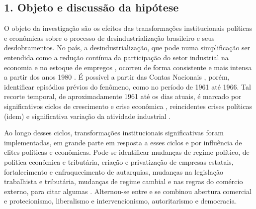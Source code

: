 \subsection{1. Objeto e discussão da hipótese}\label{objeto-e-discussuxe3o-da-hipuxf3tese}

O objeto da investigação são os efeitos das transformações
institucionais políticas e econômicas sobre o processo de
desindustrialização brasileiro e seus desdobramentos. No país, a
desindustrialização, que pode numa simplificação ser entendida como a
redução contínua da participação do setor industrial na economia e no
estoque de empregos
\citep{tregenna_characterising_2009},
ocorreu de forma consistente e mais intensa a partir dos anos 1980
\citep{oreiro_desindustrializacao_2010}. É possível a partir das Contas Nacionais
\citep{ibge_sd},
porém, identificar episódios prévios do fenômeno, como no período de
1961 até 1966. Tal recorte temporal, de aproximadamente 1961 até os dias
atuais, é marcado por significativos ciclos de crescimento e crise
econômica \citep{souza_historia_2022,viannavillela2015}, reincidentes crises
políticas (idem) e significativa variação da atividade industrial
\citep{morceiro2021}.

Ao longo desses ciclos, transformações institucionais significativas
foram implementadas, em grande parte em resposta a esses ciclos e por
influência de elites políticas e econômicas. Pode-se identificar
mudanças de regime político, de política econômica e tributária, criação
e privatização de empresas estatais, fortalecimento e enfraquecimento de
autarquias, mudanças na legislação trabalhista e tributária, mudanças de
regime cambial e nas regras do comércio externo, para citar algumas
\citep{abreu_ordem_2014,souza_historia_2022,viannavillela2015}. Alternou-se entre e se
combinou abertura comercial e protecionismo, liberalismo e
intervencionismo, autoritarismo e democracia.


